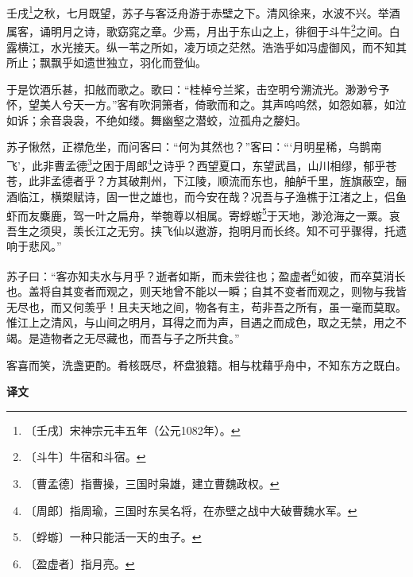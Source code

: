 \documentclass[12pt,UTF-8,openany,a4]{ctexbook}
\begin{document}
\begin{large}
    
    壬戌\footnote{〔壬戌〕\yiwen 宋神宗元丰五年（公元1082年）。}之秋，七月既望，苏子与客泛舟游于赤壁之下。清风徐来，水波不兴。举酒属客，诵明月之诗，歌窈窕之章。少焉，月出于东山之上，徘徊于斗牛\footnote{〔斗牛〕\yiwen 牛宿和斗宿。}之间。白露横江，水光接天。纵一苇之所如，凌万顷之茫然。浩浩乎如冯虚御风，而不知其所止；飘飘乎如遗世独立，羽化而登仙。
    
    于是饮酒乐甚，扣舷而歌之。歌曰：“桂棹兮兰桨，击空明兮溯流光。渺渺兮予怀，望美人兮天一方。”客有吹洞箫者，倚歌而和之。其声呜呜然，如怨如慕，如泣如诉；余音袅袅，不绝如缕。舞幽壑之潜蛟，泣孤舟之嫠妇。
    
    苏子愀然，正襟危坐，而问客曰：“何为其然也？”客曰：“‘月明星稀，乌鹊南飞’，此非曹孟德\footnote{〔曹孟德〕\yiwen 指曹操，三国时枭雄，建立曹魏政权。}之困于周郎\footnote{〔周郎〕\yiwen 指周瑜，三国时东吴名将，在赤壁之战中大破曹魏水军。}之诗乎？西望夏口，东望武昌，山川相缪，郁乎苍苍，此非孟德者乎？方其破荆州，下江陵，顺流而东也，舳舻千里，旌旗蔽空，酾酒临江，横槊赋诗，固一世之雄也，而今安在哉？况吾与子渔樵于江渚之上，侣鱼虾而友麋鹿，驾一叶之扁舟，举匏尊以相属。寄蜉蝣\footnote{〔蜉蝣〕\yiwen 一种只能活一天的虫子。}于天地，渺沧海之一粟。哀吾生之须臾，羡长江之无穷。挟飞仙以遨游，抱明月而长终。知不可乎骤得，托遗响于悲风。”
    
    苏子曰：“客亦知夫水与月乎？逝者如斯，而未尝往也；盈虚者\footnote{〔盈虚者〕\yiwen 指月亮。}如彼，而卒莫消长也。盖将自其变者而观之，则天地曾不能以一瞬；自其不变者而观之，则物与我皆无尽也，而又何羡乎！且夫天地之间，物各有主，苟非吾之所有，虽一毫而莫取。惟江上之清风，与山间之明月，耳得之而为声，目遇之而成色，取之无禁，用之不竭。是造物者之无尽藏也，而吾与子之所共食。”
    
    客喜而笑，洗盏更酌。肴核既尽，杯盘狼籍。相与枕藉乎舟中，不知东方之既白。
\end{large}


\newpage

\begin{Large}
    \noindent\textbf{译文}
\end{Large}


\vspace{1em}
\end{document}
